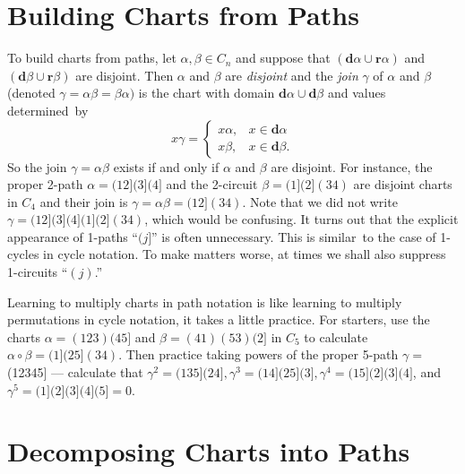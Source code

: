 \documentclass{surv-l}
\numberwithin{equation}{section}
\numberwithin{table}{section}
\numberwithin{figure}{section}
\theoremstyle{definition}
\begin{document}
\section{Building Charts from Paths}\label{sec1.2}

To build charts from paths, let $\alpha,\beta\in C_{n}$ and
suppose that $(\mathbf{d}\alpha\cup \mathbf{r}\alpha)$ and
$(\mathbf{d}\beta \cup\mathbf{r}\beta)$ are disjoint. Then
$\alpha$ and $\beta$ are \emph{disjoint} and the \emph{join}
$\gamma$ of $\alpha$ and $\beta$ (denoted
$\gamma=\alpha\beta=\beta\alpha)$ is the chart with domain
$\mathbf{d}\alpha \cup\mathbf{d}\beta$ and values determined~by
\[
x\gamma=\begin{cases}
x\alpha, & x\in \mathbf{d}\alpha\\
 x\beta, & x\in \mathbf{d}\beta.
\end{cases}
\]
So the join $\gamma=\alpha\beta$ exists if and only if $\alpha$
and $\beta$ are disjoint. For instance, the proper 2-path
$\alpha=(12](3](4]$ and the 2-circuit $\beta=(1](2](34)$ are
disjoint charts in $C_{4}$ and their join is
$\gamma=\alpha\beta=(12](34)$. Note that we did not write
$\gamma=(12](3](4](1](2](34)$, which would be confusing. It turns
out that the explicit appearance of 1-paths ``$(j]$'' is often
unnecessary. This is similar~to the case of 1-cycles in cycle
notation. To make matters worse, at times we shall also suppress
1-circuits ``$(j)$.''

Learning to multiply charts in path
notation is like learning to multiply permutations in cycle
notation, it takes a little practice. For starters, use the charts
$\alpha=(123)(45]$ and $\beta=(41)(53)(2]$ in $C_{5}$ to calculate
$\alpha \circ\beta=(1](25](34)$. Then practice taking powers of
the proper 5-path $\gamma=$ (12345] --- calculate that
$\gamma^{2}=(135](24],\gamma^{3}=(14](25](3],\gamma^{4}=(15](2](3](4]$,
and $\gamma^{5}=(1](2](3](4](5]=0$.

\section{Decomposing Charts into Paths}\label{sec1.3}
\end{document}
